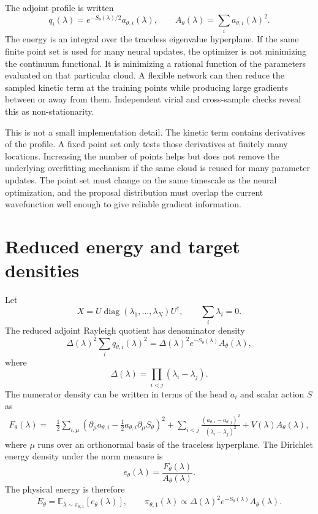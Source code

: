 \documentclass[11pt]{article}
\newcommand{\diag}{\operatorname{diag}}
\newcommand{\E}{\mathbb{E}}
\newcommand{\D}{\Delta}
\begin{document}
The adjoint profile is written
\begin{equation}
 q_i(\lambda)=e^{-S_\theta(\lambda)/2}a_{\theta,i}(\lambda),
 \qquad
 A_\theta(\lambda)=\sum_i a_{\theta,i}(\lambda)^2.
 \label{eq:q_factor}
\end{equation}
The energy is an integral over the traceless eigenvalue hyperplane.  If the same finite point set is used for many neural updates, the optimizer is not minimizing the continuum functional.  It is minimizing a rational function of the parameters evaluated on that particular cloud.  A flexible network can then reduce the sampled kinetic term at the training points while producing large gradients between or away from them.  Independent virial and cross-sample checks reveal this as non-stationarity.

This is not a small implementation detail.  The kinetic term contains derivatives of the profile.  A fixed point set only tests those derivatives at finitely many locations.  Increasing the number of points helps but does not remove the underlying overfitting mechanism if the same cloud is reused for many parameter updates.  The point set must change on the same timescale as the neural optimization, and the proposal distribution must overlap the current wavefunction well enough to give reliable gradient information.

\section{Reduced energy and target densities}

Let
\begin{equation}
 X=U\diag(\lambda_1,\ldots,\lambda_N)U^\dagger,
 \qquad \sum_i\lambda_i=0.
\end{equation}
The reduced adjoint Rayleigh quotient has denominator density
\begin{equation}
 \D(\lambda)^2\sum_iq_{\theta,i}(\lambda)^2
 =\D(\lambda)^2e^{-S_\theta(\lambda)}A_\theta(\lambda),
\end{equation}
where
\begin{equation}
 \D(\lambda)=\prod_{i<j}(\lambda_i-\lambda_j).
\end{equation}
The numerator density can be written in terms of the head $a_i$ and scalar action $S$ as
\begin{align}
 F_\theta(\lambda)=&\frac12\sum_{i,\mu}
 \left(\partial_\mu a_{\theta,i}-\frac12a_{\theta,i}\partial_\mu S_\theta\right)^2
 +\sum_{i<j}\frac{(a_{\theta,i}-a_{\theta,j})^2}{(\lambda_i-\lambda_j)^2}
 +V(\lambda)A_\theta(\lambda),
 \label{eq:Ftheta}
\end{align}
where $\mu$ runs over an orthonormal basis of the traceless hyperplane.  The Dirichlet energy density under the norm measure is
\begin{equation}
 e_\theta(\lambda)=\frac{F_\theta(\lambda)}{A_\theta(\lambda)}.
 \label{eq:edir}
\end{equation}
The physical energy is therefore
\begin{equation}
 E_\theta=\E_{\lambda\sim\pi_{\theta,1}}[e_\theta(\lambda)],
 \qquad
 \pi_{\theta,1}(\lambda)\propto\D(\lambda)^2e^{-S_\theta(\lambda)}A_\theta(\lambda).
 \label{eq:energy_target}
\end{equation}
\end{document}
